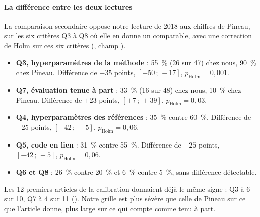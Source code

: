 \paragraph{La différence entre les deux lectures}
La comparaison secondaire oppose notre lecture de 2018 aux chiffres de Pineau, sur les
six critères Q3 à Q8 où elle en donne un comparable, avec une correction de Holm sur ces six critères
(, champ ).
\begin{itemize}
  \item \textbf{Q3, hyperparamètres de la méthode} : 55~\% (26 sur 47) chez nous, 90~\% chez Pineau.
  Différence de $-35$ points, $[-50\,;\,-17]$, $p_{\text{Holm}} = 0{,}001$.
  \item \textbf{Q7, évaluation tenue à part} : 33~\% (16 sur 48) chez nous, 10~\% chez Pineau. Différence de
  $+23$ points, $[+7\,;\,+39]$, $p_{\text{Holm}} = 0{,}03$.
  \item \textbf{Q4, hyperparamètres des références} : 35~\% contre 60~\%. Différence de $-25$ points,
  $[-42\,;\,-5]$, $p_{\text{Holm}} = 0{,}06$.
  \item \textbf{Q5, code en lien} : 31~\% contre 55~\%. Différence de $-25$ points, $[-42\,;\,-5]$,
  $p_{\text{Holm}} = 0{,}06$.
  \item \textbf{Q6 et Q8} : 26~\% contre 20~\% et 6~\% contre 5~\%, sans différence détectable.
\end{itemize}


Les 12 premiers articles de la calibration donnaient déjà le même signe : Q3 à 6 sur 10, Q7 à 4 sur
11 (). Notre grille est plus sévère que celle de Pineau sur ce que l'article
donne, plus large sur ce qui compte comme tenu à part.

